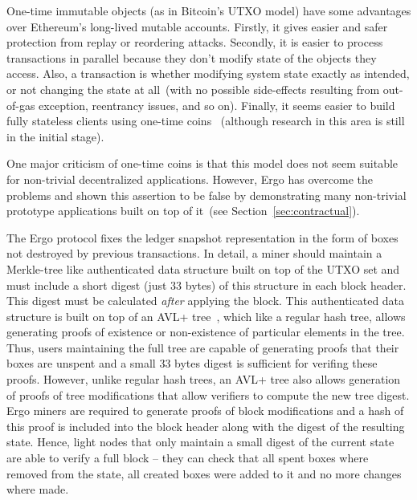 
One-time immutable objects (as in Bitcoin's UTXO model) have some advantages over Ethereum's long-lived mutable accounts.
Firstly, it gives easier and safer protection from replay or reordering attacks.
Secondly, it is easier to process transactions in parallel because they don't modify state of the objects they access.
Also, a transaction is whether modifying system state exactly as intended, or not changing the state at all~(with no
possible side-effects resulting from out-of-gas exception, reentrancy issues, and so on).    
Finally, it seems easier to build fully stateless clients using one-time coins~\cite{chepurnoy2018edrax} (although research in this area is still in the initial stage).

One major criticism of one-time coins is that this model does not seem suitable for non-trivial decentralized applications. However, Ergo has overcome the problems and shown this assertion to be false by
demonstrating many non-trivial prototype applications built on top of
it~(see Section~\ref{sec:contractual}).

The Ergo protocol fixes the ledger snapshot representation in the form of boxes not destroyed by previous transactions.
In detail, a miner should maintain a Merkle-tree like authenticated data structure built on top of the UTXO set and must include a short digest (just 33 bytes) of this structure in each block header. This digest must be calculated {\em after} applying the block.
This authenticated data structure is built on top of an AVL+ tree~\cite{reyzin2017improving}, which like a regular hash tree,
allows generating proofs of existence or non-existence of particular elements in the tree.
Thus, users maintaining the full tree are capable of generating proofs that their boxes are unspent and a small 33 bytes digest is sufficient for verifing these proofs.
However, unlike regular hash trees, an AVL+ tree also allows generation of proofs of tree modifications that allow verifiers to compute the new tree digest.
Ergo miners are required to generate proofs of block modifications and a hash of this proof is included into the block header along with the digest of the resulting state.
Hence, light nodes that only maintain a small digest of the current state are able to verify a full block -- they can check that all spent boxes where
removed from the state, all created boxes were added to it and no more changes where made. 

